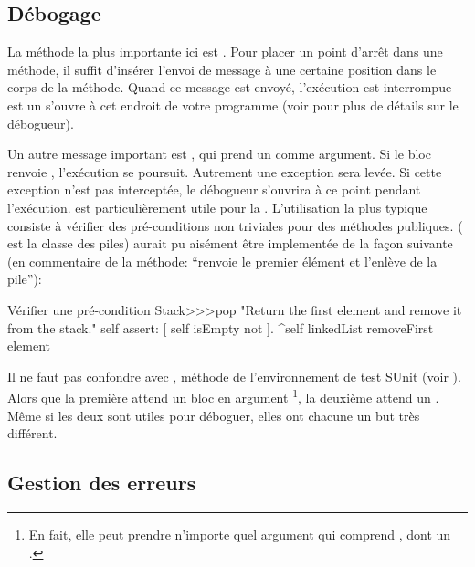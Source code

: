 \documentclass[a4paper,10pt,twoside]{book}
\begin{document}
\subsection{D\'ebogage}

La m\'ethode la plus importante ici est . Pour placer un point d'arr\^et dans une m\'ethode, il suffit d'ins\'erer l'envoi de message  \`a une certaine position dans le corps de la m\'ethode.  Quand ce message est envoy\'e, l'ex\'ecution est interrompue est un  s'ouvre \`a cet endroit de votre programme
(voir  pour plus de d\'etails sur le d\'ebogueur).


Un autre message important est , qui prend un
 comme argument. Si le bloc renvoie , l'ex\'ecution
se poursuit. Autrement une exception sera lev\'ee. Si  cette exception
n'est pas intercept\'ee, le d\'ebogueur s'ouvrira \`a ce point pendant
l'ex\'ecution.  est particuli\`erement utile pour la
. L'utilisation la plus typique
consiste \`a v\'erifier des pr\'e-conditions non triviales pour des
m\'ethodes publiques.  
( est la classe des piles)
aurait pu ais\'ement \^etre implement\'ee de la fa\c{c}on suivante
(en commentaire de la m\'ethode: ``renvoie le premier \'el\'ement et
l'enl\`eve de la pile''):

\begin{method}{V\'erifier une pr\'e-condition}
Stack>>>pop
    "Return the first element and remove it from the stack."
    self assert: [ self isEmpty not ].
    ^self linkedList removeFirst element
\end{method}

Il ne faut pas confondre  avec , m\'ethode de l'environnement de test SUnit (voir ). Alors que la premi\`ere attend un bloc en argument \footnote{En fait, elle peut prendre n'importe quel argument qui comprend , dont un .}, la deuxi\`eme attend un . M\^eme si les deux sont utiles pour d\'eboguer, elles ont chacune un but tr\`es diff\'erent.

\subsection{Gestion des erreurs}
\end{document}
